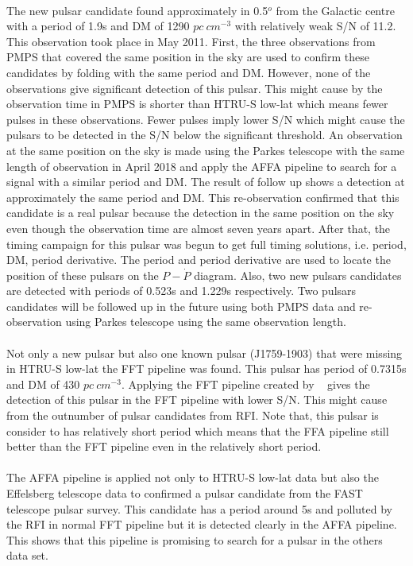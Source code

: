 \documentclass[../chapter1/thesis_msc.tex]{subfiles}
\begin{document}
\paragraph{} The new pulsar candidate found approximately in 0.5$^o$ from the Galactic centre with a period of 1.9s and DM of 1290 $pc~cm^{-3}$ with relatively weak S/N of 11.2. This observation took place in May 2011. First, the three observations from PMPS that covered the same position in the sky are used to confirm these candidates by folding with the same period and DM. However, none of the observations give significant detection of this pulsar. This might cause by the observation time in PMPS is shorter than HTRU-S low-lat which means fewer pulses in these observations. Fewer pulses imply lower S/N which might cause the pulsars to be detected in the S/N below the significant threshold.  An observation at the same position on the sky is made using the Parkes telescope with the same length of observation in April 2018 and apply the AFFA pipeline to search for a signal with a similar period and DM. The result of follow up shows a detection at approximately the same period and DM. This re-observation confirmed that this candidate is a real pulsar because the detection in the same position on the sky even though the observation time are almost seven years apart. After that, the timing campaign for this pulsar was begun to get full timing solutions, i.e. period, DM, period derivative. The period and period derivative are used to locate the position of these pulsars on the $P-\Dot{P}$ diagram. Also, two new pulsars candidates are detected with periods of 0.523s and 1.229s respectively. Two pulsars candidates will be followed up in the future using both PMPS data and re-observation using Parkes telescope using the same observation length.
\paragraph{} Not only a new pulsar but also one known pulsar (J1759-1903) that were missing in HTRU-S low-lat the FFT pipeline was found. This pulsar has period of 0.7315s and DM of 430 $pc~cm^{-3}$. Applying the FFT pipeline created by ~\cite{Ng} gives the detection of this pulsar in the FFT pipeline with lower S/N. This might cause from the outnumber of pulsar candidates from RFI. Note that, this pulsar is consider to has relatively short period which means that the FFA pipeline still better than the FFT pipeline even in the relatively short period.
\paragraph{} The AFFA pipeline is applied not only to HTRU-S low-lat data but also the Effelsberg telescope data to confirmed a pulsar candidate from the FAST telescope pulsar survey. This candidate has a period around 5s and polluted by the RFI in normal FFT pipeline but it is detected clearly in the AFFA pipeline. This shows that this pipeline is promising to search for a pulsar in the others data set.
\end{document}
